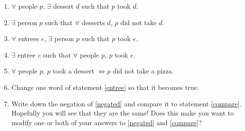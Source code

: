 \begin{enumerate}
\begin{enumerate}
\item \label{negated}$\forall$ people $p$, $\exists$ dessert $d$ such that $ p$
took $d$.
\item \label{compare}$\exists$ person $p$ such that $\forall$ desserts
$d$, $p$ did not take $d$.
\item $\forall$ entrees $e$, $\exists$ person $p$ such that $ p$ took
$e$. 
\item \label{entree}$\exists$ entree $e$ such that  $\forall$ people
$p,\ p$ took $e$.
\item $\forall$ people $p$, $p$ took a dessert $\iff p$ did not take
a pizza.
\item Change one word of statement \ref{entree} so that it becomes true.
\item Write down the negation of \ref{negated} and compare it to statement
\ref{compare}. Hopefully you will see that they are the same! Does
this make you want to modify one or both of your answers to \ref{negated}
and \ref{compare}?
\end{enumerate}

\end{enumerate}
